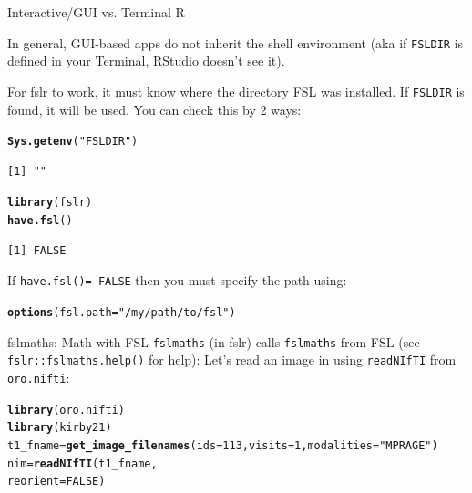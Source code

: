 \documentclass[11pt]{beamer}\usepackage[]{graphicx}\usepackage[]{color}
\makeatletter
\newcommand{\hlnum}[1]{\textcolor[rgb]{0.686,0.059,0.569}{#1}}%
\newcommand{\hlstr}[1]{\textcolor[rgb]{0.192,0.494,0.8}{#1}}%
\newcommand{\hlstd}[1]{\textcolor[rgb]{0.345,0.345,0.345}{#1}}%
\newcommand{\hlkwb}[1]{\textcolor[rgb]{0.69,0.353,0.396}{#1}}%
\newcommand{\hlkwc}[1]{\textcolor[rgb]{0.333,0.667,0.333}{#1}}%
\newcommand{\hlkwd}[1]{\textcolor[rgb]{0.737,0.353,0.396}{\textbf{#1}}}%
\newenvironment{kframe}{%
 \def\at@end@of@kframe{}%
 \ifinner\ifhmode%
  \def\at@end@of@kframe{\end{minipage}}%
  \begin{minipage}{\columnwidth}%
 \fi\fi%
 \def\FrameCommand##1{\hskip\@totalleftmargin \hskip-\fboxsep
 \colorbox{shadecolor}{##1}\hskip-\fboxsep
     \hskip-\linewidth \hskip-\@totalleftmargin \hskip\columnwidth}%
 \MakeFramed {\advance\hsize-\width
   \@totalleftmargin\z@ \linewidth\hsize
   \@setminipage}}%
 {\par\unskip\endMakeFramed%
 \at@end@of@kframe}
\newenvironment{knitrout}{}{} %
\makeatother
\begin{document}
\begin{frame}[fragile]{Interactive/GUI vs. Terminal R}

In general, GUI-based apps do not inherit the shell environment (aka if \verb|FSLDIR| is defined in your Terminal, RStudio doesn't see it).

For fslr to work, it must know where the directory FSL was installed.  If \verb|FSLDIR| is found, it will be used.  You can check this by 2 ways:

\begin{knitrout}
\color{fgcolor}\begin{kframe}
\begin{alltt}
\hlkwd{Sys.getenv}\hlstd{(}\hlstr{"FSLDIR"}\hlstd{)}
\end{alltt}
\begin{verbatim}
[1] ""
\end{verbatim}
\begin{alltt}
\hlkwd{library}\hlstd{(fslr)}
\hlkwd{have.fsl}\hlstd{()}
\end{alltt}
\begin{verbatim}
[1] FALSE
\end{verbatim}
\end{kframe}
\end{knitrout}

If \verb|have.fsl()= FALSE| then you must specify the path using:

\begin{knitrout}
\color{fgcolor}\begin{kframe}
\begin{alltt}
\hlkwd{options}\hlstd{(}\hlkwc{fsl.path}\hlstd{=}\hlstr{"/my/path/to/fsl"}\hlstd{)}
\end{alltt}
\end{kframe}
\end{knitrout}



\end{frame}


\begin{frame}[fragile]{fslmaths: Math with FSL}
\verb|fslmaths| (in fslr) calls \verb|fslmaths| from FSL (see \verb|fslr::fslmaths.help()| for help):
Let's read an image in using \verb|readNIfTI| from \verb|oro.nifti|:

\begin{knitrout}
\color{fgcolor}\begin{kframe}
\begin{alltt}
\hlkwd{library}\hlstd{(oro.nifti)}
\hlkwd{library}\hlstd{(kirby21)}
\hlstd{t1_fname} \hlkwb{=} \hlkwd{get_image_filenames}\hlstd{(}\hlkwc{ids} \hlstd{=} \hlnum{113}\hlstd{,} \hlkwc{visits} \hlstd{=} \hlnum{1}\hlstd{,} \hlkwc{modalities} \hlstd{=} \hlstr{"MPRAGE"}\hlstd{)}
\hlstd{nim} \hlkwb{=} \hlkwd{readNIfTI}\hlstd{(t1_fname,}
                \hlkwc{reorient}\hlstd{=}\hlnum{FALSE}\hlstd{)}
\end{alltt}
\end{kframe}
\end{knitrout}
\end{frame}
\end{document}
